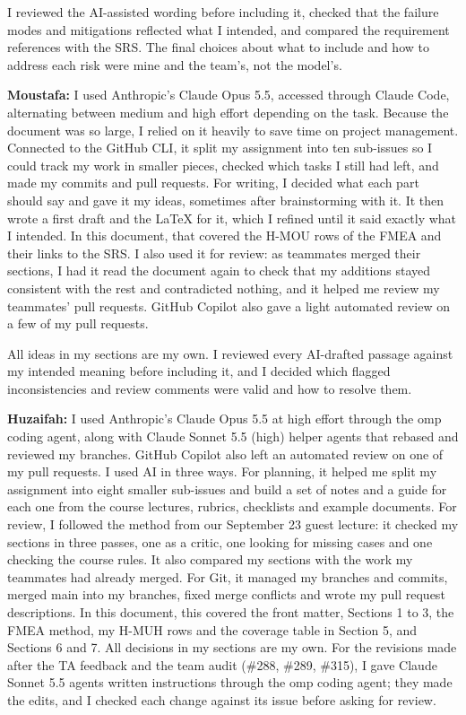 \documentclass{article}
\begin{document}
I reviewed the AI-assisted wording before including it, checked that the failure
modes and mitigations reflected what I intended, and compared the requirement
references with the SRS. The final choices about what to include and how to
address each risk were mine and the team's, not the model's.

\textbf{Moustafa:} I used Anthropic's Claude Opus 5.5, accessed through Claude
Code, alternating between medium and high effort depending on the task. Because
the document was so large, I relied on it heavily to save time on project
management. Connected to the GitHub CLI, it split my assignment into ten
sub-issues so I could track my work in smaller pieces, checked which tasks I
still had left, and made my commits and pull requests. For writing, I decided
what each part should say and gave it my ideas, sometimes after brainstorming
with it. It then wrote a first draft and the \LaTeX{} for it, which I refined
until it said exactly what I intended. In this document, that covered the H-MOU
rows of the FMEA and their links to the SRS. I also used it for review: as
teammates merged their sections, I had it read the document again to check that
my additions stayed consistent with the rest and contradicted nothing, and it
helped me review my teammates' pull requests. GitHub Copilot also gave a light
automated review on a few of my pull requests.

All ideas in my sections are my own. I reviewed every AI-drafted passage against
my intended meaning before including it, and I decided which flagged
inconsistencies and review comments were valid and how to resolve them.

\textbf{Huzaifah:} I used Anthropic's Claude Opus 5.5 at high effort through the
omp coding agent, along with Claude Sonnet 5.5 (high) helper agents that rebased
and reviewed my branches. GitHub Copilot also left an automated review on one of
my pull requests. I used AI in three ways. For planning, it helped me split my
assignment into eight smaller sub-issues and build a set of notes and a guide
for each one from the course lectures, rubrics, checklists and example
documents. For review, I followed the method from our September 23 guest
lecture: it checked my sections in three passes, one as a critic, one looking
for missing cases and one checking the course rules. It also compared my
sections with the work my teammates had already merged. For Git, it managed my
branches and commits, merged main into my branches, fixed merge conflicts and
wrote my pull request descriptions. In this document, this covered the front
matter, Sections 1 to 3, the FMEA method, my H-MUH rows and the coverage table
in Section 5, and Sections 6 and 7. All decisions in my sections are my own.
For the revisions made after the TA feedback and the team audit (\#288, \#289,
\#315), I gave Claude Sonnet 5.5 agents written instructions through the omp
coding agent; they made the edits, and I checked each change against its issue
before asking for review.
\end{document}
